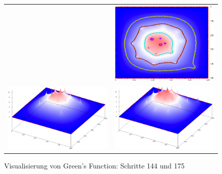 \begin{refsection}
\begin{figure}
\begin{tabular}{cc}
& \includegraphics[width=\breite]{green/images/resultate/cp/step0175.png}\vspace{1cm}\\
\includegraphics[width=\breite]{green/images/resultate/np/step0144.png}
& \includegraphics[width=\breite]{green/images/resultate/np/step0175.png}
\end{tabular}		
\caption{Visualisierung von Green's Function: Schritte 144 und 175 }
\end{figure}

\printbibliography[heading=subbibliography]
\end{refsection}
